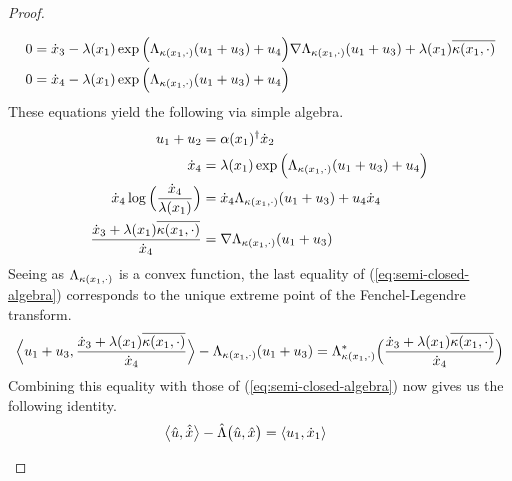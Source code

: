 \begin{proof}
\begin{enumerate}
\begin{align*}
        0 &= \dot{x}_3 - \lambda(x_1) \exp\Big( \Lambda_{\kappa(x_1,\cdot)}(u_1+u_3) + u_4\Big) \nabla\Lambda_{\kappa(x_1,\cdot)}(u_1+u_3) + \lambda(x_1) \overline{\kappa(x_1, \cdot)} \\
        0 &= \dot{x}_4 - \lambda(x_1) \exp\Big( \Lambda_{\kappa(x_1,\cdot)}(u_1+u_3) + u_4\Big) 
      \end{align*}
      These equations yield the following via simple algebra.
      \begin{equation}
        \label{eq:semi-closed-algebra}
        \begin{aligned}
          u_1 + u_2 &= \alpha(x_1)^\dagger \dot{x}_2 \\
          \dot{x}_4 &= \lambda(x_1) \exp\Big( \Lambda_{\kappa(x_1,\cdot)}(u_1+u_3) + u_4\Big)  \\
          \dot{x}_4\log\Big(\frac{\dot{x}_4}{\lambda(x_1)}\Big) &=   \dot{x}_4\Lambda_{\kappa(x_1,\cdot)}(u_1+u_3) + u_4\dot{x}_4 \\
          \frac{\dot{x}_3 + \lambda(x_1)\overline{\kappa(x_1,\cdot)}}{\dot{x}_4} &= \nabla\Lambda_{\kappa(x_1,\cdot)}(u_1+u_3)
        \end{aligned}
      \end{equation}
      Seeing as $\Lambda_{\kappa(x_1,\cdot)}$ is a convex function, the last equality of (\ref{eq:semi-closed-algebra}) corresponds to the unique extreme point of the Fenchel-Legendre transform.
      \begin{equation*}
        {\Big\langle u_1 + u_3 , \frac{\dot{x}_3+\lambda(x_1)\overline{\kappa(x_1,\cdot)}}{\dot{x}_4} \Big\rangle} - \Lambda_{\kappa(x_1,\cdot)}(u_1+u_3) = \Lambda_{\kappa(x_1,\cdot)}^*\Big(\frac{\dot{x}_3+\lambda(x_1)\overline{\kappa(x_1,\cdot)}}{\dot{x}_4}\Big)
      \end{equation*}
      Combining this equality with those of (\ref{eq:semi-closed-algebra}) now gives us the following identity.
      \begin{align*}
        \bprj{\hat\momentVar}{\hat\diffVar} - \hat\ode\big(\hat\momentVar, \hat\stateVar\big) 
        &=\begin{aligned}[t]
          &\prj{\momentVar_1}{\diffVar_1} 

\end{aligned}
\end{align*}
\end{enumerate}
\end{proof}
